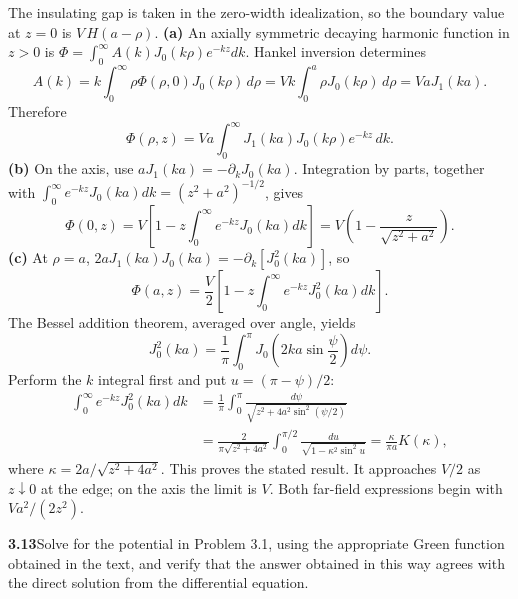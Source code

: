 The insulating gap is taken in the zero-width idealization, so the
boundary value at $z=0$ is $V\,H(a-\rho)$.
\textbf{(a)} An axially symmetric decaying harmonic function in $z>0$
is $\Phi=\int_0^\infty A(k)J_0(k\rho)e^{-kz}dk$.
Hankel inversion determines
\[
A(k)=k\int_0^\infty\rho\Phi(\rho,0)J_0(k\rho)\,d\rho
=Vk\int_0^a\rho J_0(k\rho)\,d\rho=VaJ_1(ka).
\]
Therefore
\[
\boxed{\Phi(\rho,z)=Va\int_0^\infty J_1(ka)J_0(k\rho)e^{-kz}\,dk.}
\]
\textbf{(b)} On the axis, use $aJ_1(ka)=-\partial_kJ_0(ka)$.
Integration by parts, together with
$\int_0^\infty e^{-kz}J_0(ka)dk=(z^2+a^2)^{-1/2}$, gives
\[
\Phi(0,z)=V\left[1-z\int_0^\infty e^{-kz}J_0(ka)dk\right]
=V\left(1-\frac z{\sqrt{z^2+a^2}}\right).
\]
\textbf{(c)} At $\rho=a$, $2aJ_1(ka)J_0(ka)
=-\partial_k[J_0^2(ka)]$, so
\[
\Phi(a,z)=\frac V2\left[1-z\int_0^\infty e^{-kz}J_0^2(ka)dk\right].
\]
The Bessel addition theorem, averaged over angle, yields
\[
J_0^2(ka)=\frac1\pi\int_0^\pi
J_0\!\left(2ka\sin\frac\psi2\right)d\psi.
\]
Perform the $k$ integral first and put $u=(\pi-\psi)/2$:
\begin{align*}
\int_0^\infty e^{-kz}J_0^2(ka)dk
&=\frac1\pi\int_0^\pi\frac{d\psi}
{\sqrt{z^2+4a^2\sin^2(\psi/2)}}\\
&=\frac{2}{\pi\sqrt{z^2+4a^2}}
\int_0^{\pi/2}\frac{du}{\sqrt{1-\kappa^2\sin^2u}}
=\frac{\kappa}{\pi a}K(\kappa),
\end{align*}
where $\kappa=2a/\sqrt{z^2+4a^2}$.  This proves the stated result.
It approaches $V/2$ as $z\downarrow0$ at the edge; on the axis the
limit is $V$.  Both far-field expressions begin with $Va^2/(2z^2)$.

\par\bigskip
\noindent\textbf{3.13}\quad Solve for the potential in Problem 3.1, using the appropriate Green function obtained in the text, and verify that the answer obtained in this way agrees with the direct solution from the differential equation.
\solution


